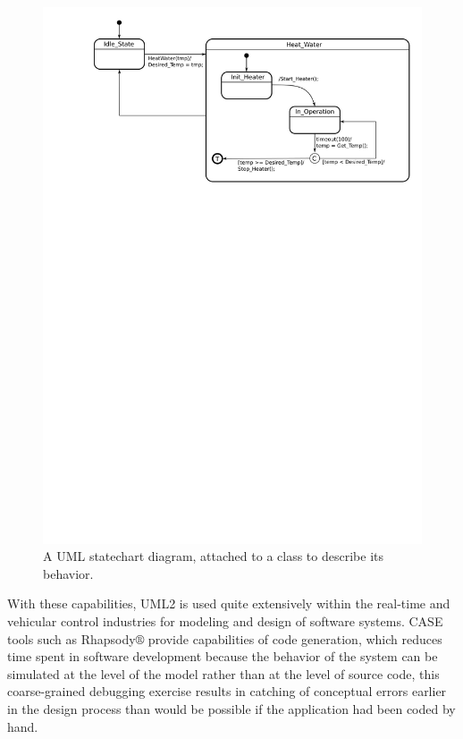 \begin{figure}
\centering
\includegraphics[scale=0.5]{figs/statechart}
\caption{A UML statechart diagram, attached to a class to describe its
  behavior.}
\label{fig:statechart}
\end{figure}

With these capabilities, UML2 is used quite extensively within the
real-time and vehicular control industries for modeling and design of
software systems. CASE tools such as Rhapsody$\circledR$ provide
capabilities of code generation, which reduces time spent in software
development because the behavior of the system can be simulated at the
level of the model rather than at the level of source code, this
coarse-grained debugging exercise results in catching of conceptual
errors earlier in the design process than would be possible if the
application had been coded by hand.

